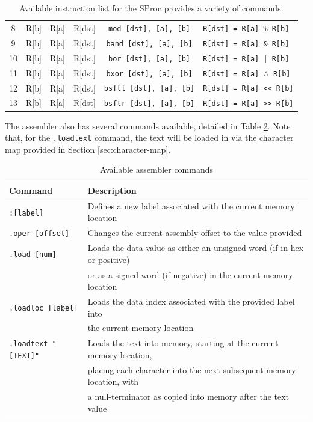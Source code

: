\documentclass{article}
\begin{document}
\begin{table}[h!]
\begin{footnotesize}
\begin{tabular}{cccc|c|l}
			8 & R[b] & R[a] & R[dst] & \texttt{mod [dst], [a], [b]} & \texttt{R[dst] = R[a] \% R[b]} \\
			9 & R[b] & R[a] & R[dst] & \texttt{band [dst], [a], [b]} & \texttt{R[dst] = R[a] \& R[b]} \\
			10 & R[b] & R[a] & R[dst] & \texttt{bor [dst], [a], [b]} & \texttt{R[dst] = R[a] | R[b]} \\
			11 & R[b] & R[a] & R[dst] & \texttt{bxor [dst], [a], [b]} & \texttt{R[dst] = R[a] $\wedge$ R[b]} \\
			12 & R[b] & R[a] & R[dst] & \texttt{bsftl [dst], [a], [b]} & \texttt{R[dst] = R[a] << R[b]} \\
			13 & R[b] & R[a] & R[dst] & \texttt{bsftr [dst], [a], [b]} & \texttt{R[dst] = R[a] >> R[b]} \\
			\hline
		\end{tabular}
	\end{footnotesize}
	\caption{Available instruction list for the SProc provides a variety of commands.}
	\label{table:instruction-table}
\end{table}

\pagebreak

The assembler also has several commands available, detailed in Table \ref{table:assembler-commands}. Note that, for the \texttt{.loadtext} command, the text will be loaded in via the character map provided in Section \ref{sec:character-map}.

\begin{table}[h!]
	\centering
	\begin{tabular}{l|l}
		\hline
		Command & Description \\
		\hline
		\texttt{:[label]} & Defines a new label associated with the current memory location \\
		\texttt{.oper [offset]} & Changes the current assembly offset to the value provided \\
		\texttt{.load [num]} & Loads the data value as either an unsigned word (if in hex or positive)\\
		& or as a signed word (if negative) in the current memory location \\
		\texttt{.loadloc [label]} & Loads the data index associated with the provided label into \\
		& the current memory location \\
		\texttt{.loadtext "[TEXT]"} & Loads the text into memory, starting at the current memory location, \\
		& placing each character into the next subsequent memory location, with \\
		& a null-terminator as copied into memory after the text value \\
		\hline
	\end{tabular}
	\caption{Available assembler commands}
	\label{table:assembler-commands}
\end{table}
\end{document}
